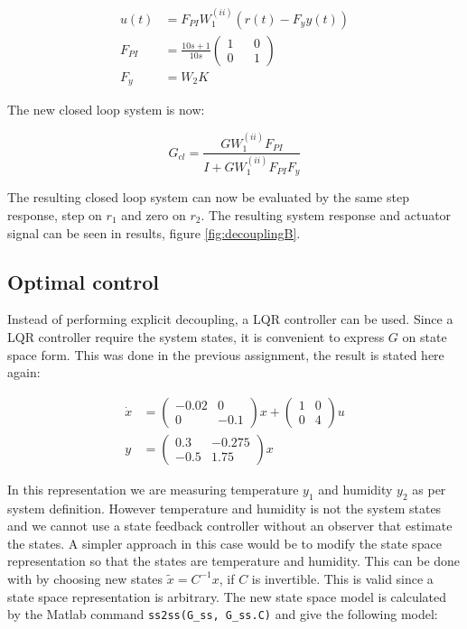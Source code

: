 \documentclass[a4paper, titlepage]{article}
\begin{document}
\begin{equation}
\begin{split}
u(t) &= F_{PI}W^{(ii)}_1(r(t) - F_yy(t)) \\
F_{PI} &= \frac{10s+1}{10s}
\begin{pmatrix}
1 && 0 \\ 0 && 1
\end{pmatrix} \\
F_y &= W_2K
\end{split}
\end{equation}

The new closed loop system is now:

\begin{equation}
G_{cl} = \frac{GW^{(ii)}_1F_{PI}}{I+GW^{(ii)}_1F_{PI}F_y}
\end{equation}

The resulting closed loop system can now be evaluated by the same step response, step on $r_1$ and zero on $r_2$.
The resulting system response and actuator signal can be seen in results, figure \ref{fig:decouplingB}.

\subsection{Optimal control}
Instead of performing explicit decoupling, a LQR controller can be used.
Since a LQR controller require the system states, it is convenient to express $G$ on state space form.
This was done in the previous assignment, the result is stated here again:

\begin{equation}
\begin{split}
\dot{x} &= 
\begin{pmatrix}
-0.02 & 0 \\ 0 & -0.1
\end{pmatrix}x
+
\begin{pmatrix}
1 & 0 \\ 0 & 4
\end{pmatrix}u \\
y &= 
\begin{pmatrix}
0.3 & -0.275 \\ -0.5 & 1.75
\end{pmatrix}x
\end{split}
\label{equ:oldSS}
\end{equation}

In this representation we are measuring temperature $y_1$ and humidity $y_2$ as per system definition.
However temperature and humidity is not the system states and we cannot use a state feedback controller without an observer that estimate the states.
A simpler approach in this case would be to modify the state space representation so that the states are temperature and humidity.
This can be done with by choosing new states $\tilde{x} = C^{-1}x$, if $C$ is invertible.
This is valid since a state space representation is arbitrary.
The new state space model is calculated by the Matlab command \verb|ss2ss(G_ss, G_ss.C)| and give the following model:
\end{document}
